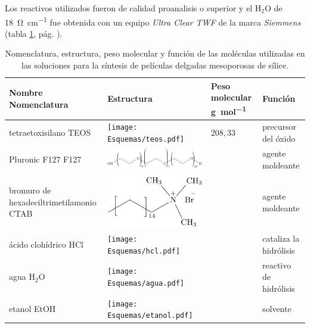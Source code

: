 		Los reactivos utilizados fueron de calidad proanalisis o superior y el H$_2$O de \SI{18}{\ohm.\cm^{-1}} fue obtenida con un equipo \textit{Ultra Clear TWF} de la marca \textit{Siemmens} (tabla \ref{tabla:reactivos}, pág. \pageref{tabla:reactivos}). 
				\begin{table}[ht!] 
						  \caption[Reactivos para los soles]{Nomenclatura, estructura, peso molecular y función de las moléculas utilizadas en las soluciones para la síntesis de películas delgadas mesoporosas de sílice.} 
				  		  \begin{tabular}{>{\raggedright\arraybackslash}m{2.40cm}>{\centering\arraybackslash}m{4cm}>{\centering\arraybackslash}m{2.35cm}>{\raggedright\arraybackslash}m{1.7cm}} 
				  		  \toprule
						  Nombre Nomenclatura    & Estructura & Peso molecular \si{g.mol^{-1}} & Función\\ \midrule
				      	  tetraetoxisilano TEOS & \texttt{[image: Esquemas/teos.pdf]} & $208,33$ & precursor del óxido  \\ \midrule
				  		  Pluronic F127 F127    & \hspace*{-10px} \includegraphics[scale=0.5]{Esquemas/f127.pdf} & \multirow{1}{*}{$13800$}	 & agente moldeante	 \\ \midrule
				  		  bromuro de hexadeciltrimetilamonio  CTAB   & \hspace*{1cm} \includegraphics[scale=0.6]{Esquemas/ctab.pdf} & \multirow{1}{*}{$364.48$}	 & agente moldeante	 \\ \midrule
				  		  ácido clohídrico HCl& \texttt{[image: Esquemas/hcl.pdf]}  & \multirow{1}{*}{$36,46$}   & cataliza la hidrólisis \\ \midrule
				  		  agua \hspace{2cm} H$_2$O  &  \texttt{[image: Esquemas/agua.pdf]}  & \multirow{1}{*}{$18,02$}   & reactivo de hidrólisis \\ \midrule
				  		  etanol \hspace{2cm} EtOH  & \texttt{[image: Esquemas/etanol.pdf]}  & \multirow{1}{*}{$46,07$}   & solvente \\ 
				  		  \bottomrule
				    	  \end{tabular}
				   		  \label{tabla:reactivos}
				 \end{table}
		
